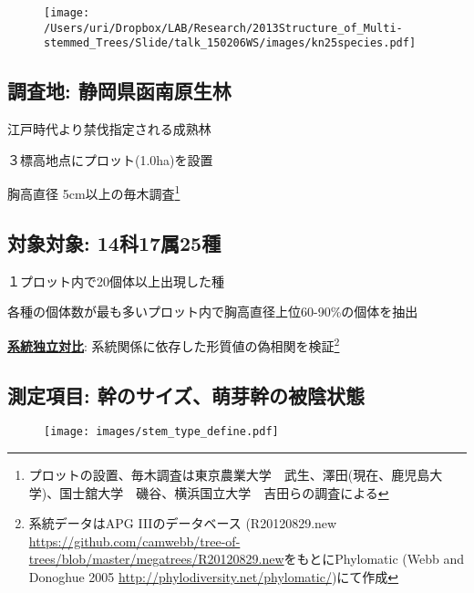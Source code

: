 \documentclass[a0, 30pt, plainboxedsections]{sciposter} %
\begin{document}
\begin{multicols}{2}

\begin{wrapfigure}{r}{16.7em}
  \texttt{[image: /Users/uri/Dropbox/LAB/Research/2013Structure\_of\_Multi-stemmed\_Trees/Slide/talk\_150206WS/images/kn25species.pdf]}
\end{wrapfigure}

\subsection*{調査地: 静岡県函南原生林}

\faCaretRight 江戸時代より禁伐指定される成熟林

\faCaretRight ３標高地点にプロット(1.0ha)を設置

\faCaretRight 胸高直径 5cm以上の毎木調査\footnote{プロットの設置、毎木調査は東京農業大学　武生、澤田(現在、鹿児島大学)、国士舘大学　磯谷、横浜国立大学　吉田らの調査による}

\subsection*{対象対象: 14科17属25種}

\faCaretRight １プロット内で20個体以上出現した種

\faCaretRight 各種の個体数が最も多いプロット内で胸高直径上位60-90\%の個体を抽出

\faCaretRight \textbf{\underline{系統独立対比}}: 系統関係に依存した形質値の偽相関を検証\footnote{系統データはAPG I\hspace{-1pt}I\hspace{-1pt}Iのデータベース (R20120829.new \url{https://github.com/camwebb/tree-of-trees/blob/master/megatrees/R20120829.new}をもとにPhylomatic (Webb and Donoghue 2005 \url{http://phylodiversity.net/phylomatic/})にて作成}

\columnbreak
\subsection*{測定項目: 幹のサイズ、萌芽幹の被陰状態}

\begin{figure}
  \centering
	\texttt{[image: images/stem\_type\_define.pdf]}
\end{figure}

\vspace{-1.8em}\begin{figure}
 \begin{minipage}{0.6\hsize}

\end{minipage}
\end{figure}
\end{multicols}
\end{document}

